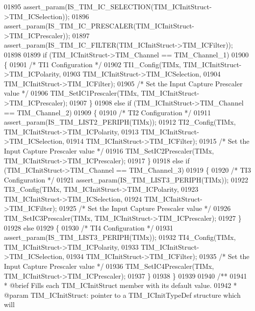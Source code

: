 \begin{DoxyCode}
01895   assert_param(IS\_TIM\_IC\_SELECTION(TIM\_ICInitStruct->TIM\_ICSelection));
01896   assert_param(IS\_TIM\_IC\_PRESCALER(TIM\_ICInitStruct->TIM\_ICPrescaler));
01897   assert_param(IS\_TIM\_IC\_FILTER(TIM\_ICInitStruct->TIM\_ICFilter));
01898 
01899   \textcolor{keywordflow}{if} (TIM\_ICInitStruct->TIM_Channel == TIM_Channel_1)
01900   \{
01901     \textcolor{comment}{/* TI1 Configuration */}
01902     TI1_Config(TIMx, TIM\_ICInitStruct->TIM_ICPolarity,
01903                TIM\_ICInitStruct->TIM_ICSelection,
01904                TIM\_ICInitStruct->TIM_ICFilter);
01905     \textcolor{comment}{/* Set the Input Capture Prescaler value */}
01906     TIM_SetIC1Prescaler(TIMx, TIM\_ICInitStruct->TIM_ICPrescaler);
01907   \}
01908   \textcolor{keywordflow}{else} \textcolor{keywordflow}{if} (TIM\_ICInitStruct->TIM_Channel == TIM_Channel_2)
01909   \{
01910     \textcolor{comment}{/* TI2 Configuration */}
01911     assert_param(IS\_TIM\_LIST2\_PERIPH(TIMx));
01912     TI2_Config(TIMx, TIM\_ICInitStruct->TIM_ICPolarity,
01913                TIM\_ICInitStruct->TIM_ICSelection,
01914                TIM\_ICInitStruct->TIM_ICFilter);
01915     \textcolor{comment}{/* Set the Input Capture Prescaler value */}
01916     TIM_SetIC2Prescaler(TIMx, TIM\_ICInitStruct->TIM_ICPrescaler);
01917   \}
01918   \textcolor{keywordflow}{else} \textcolor{keywordflow}{if} (TIM\_ICInitStruct->TIM_Channel == TIM_Channel_3)
01919   \{
01920     \textcolor{comment}{/* TI3 Configuration */}
01921     assert_param(IS\_TIM\_LIST3\_PERIPH(TIMx));
01922     TI3_Config(TIMx,  TIM\_ICInitStruct->TIM_ICPolarity,
01923                TIM\_ICInitStruct->TIM_ICSelection,
01924                TIM\_ICInitStruct->TIM_ICFilter);
01925     \textcolor{comment}{/* Set the Input Capture Prescaler value */}
01926     TIM_SetIC3Prescaler(TIMx, TIM\_ICInitStruct->TIM_ICPrescaler);
01927   \}
01928   \textcolor{keywordflow}{else}
01929   \{
01930     \textcolor{comment}{/* TI4 Configuration */}
01931     assert_param(IS\_TIM\_LIST3\_PERIPH(TIMx));
01932     TI4_Config(TIMx, TIM\_ICInitStruct->TIM_ICPolarity,
01933                TIM\_ICInitStruct->TIM_ICSelection,
01934                TIM\_ICInitStruct->TIM_ICFilter);
01935     \textcolor{comment}{/* Set the Input Capture Prescaler value */}
01936     TIM_SetIC4Prescaler(TIMx, TIM\_ICInitStruct->TIM_ICPrescaler);
01937   \}
01938 \}
01939 
01940 \textcolor{comment}{/**}
01941 \textcolor{comment}{  * @brief  Fills each TIM\_ICInitStruct member with its default value.}
01942 \textcolor{comment}{  * @param  TIM\_ICInitStruct: pointer to a TIM\_ICInitTypeDef structure which will}

\end{DoxyCode}
